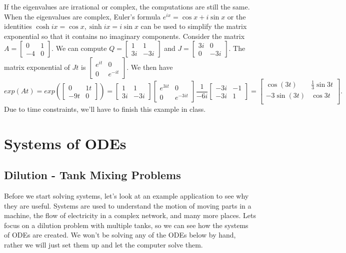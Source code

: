 If the eigenvalues are irrational or complex, the computations are still the same. When the eigenvalues are complex, Euler's formula $e^{ix}=\cos x+i\sin x$ or the identities $\cosh ix = \cos x, \sinh ix = i\sin x$ can be used to simplify the matrix exponential so that it contains no imaginary components.  Consider the matrix 
$A=
\begin{bmatrix}
 0 & 1 \\
 -4 & 0
\end{bmatrix}
$.  We can compute 
$Q=
\begin{bmatrix}
 1 & 1 \\
 3i & -3i
\end{bmatrix}
$
and
$J=
\begin{bmatrix}
 3i & 0 \\
 0 & -3i
\end{bmatrix}
$. The matrix exponential of $Jt$ is 
$
\begin{bmatrix}
 e^{i t} & 0 \\
 0 & e^{-i t}
\end{bmatrix}
$. We then have
$$exp\left(A t\right) = exp\left(
\begin{bmatrix}
 0 & 1t \\
 -9t & 0
\end{bmatrix}
\right)
=
\begin{bmatrix}
 1 & 1 \\
 3i & -3i
\end{bmatrix}
\begin{bmatrix}
 e^{3i t} & 0 \\
 0 & e^{-3i t}
\end{bmatrix}
\frac{1}{-6i}
\begin{bmatrix}
 -3i & -1 \\
 -3i & 1
\end{bmatrix}
=
\begin{bmatrix}
\cos(3t)&\frac{1}{3}\sin 3t\\
-3\sin(3t)&\cos 3t\\
\end{bmatrix}
.
$$ Due to time constraints, we'll have to finish this example in class.






\section{Systems of ODEs}
\subsection{Dilution - Tank Mixing Problems}
Before we start solving systems, let's look at an example application to see why they are useful. Systems are used to understand the motion of moving parts in a machine, the flow of electricity in a complex network, and many more places. Lets focus on a dilution problem with multiple tanks, so we can see how the systems of ODEs are created. We won't be solving any of the ODEs below by hand, rather we will just set them up and let the computer solve them.

